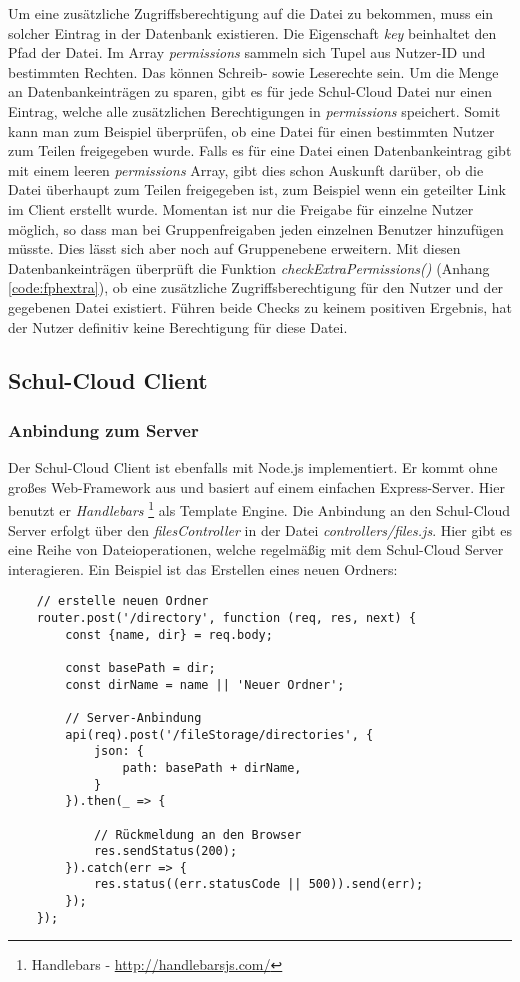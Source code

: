 Um eine zusätzliche Zugriffsberechtigung auf die Datei zu bekommen, muss ein solcher Eintrag in der Datenbank existieren. Die Eigenschaft \textit{key} beinhaltet den Pfad der Datei. Im Array \textit{permissions} sammeln sich Tupel aus Nutzer-ID und bestimmten Rechten. Das können Schreib- sowie Leserechte sein. Um die Menge an Datenbankeinträgen zu sparen, gibt es für jede Schul-Cloud Datei nur einen Eintrag, welche alle zusätzlichen Berechtigungen in \textit{permissions} speichert. Somit kann man zum Beispiel überprüfen, ob eine Datei für einen bestimmten Nutzer zum Teilen freigegeben wurde. Falls es für eine Datei einen Datenbankeintrag gibt mit einem leeren \textit{permissions} Array, gibt dies schon Auskunft darüber, ob die Datei überhaupt zum Teilen freigegeben ist, zum Beispiel wenn ein geteilter Link im Client erstellt wurde. Momentan ist nur die Freigabe für einzelne Nutzer möglich, so dass man bei Gruppenfreigaben jeden einzelnen Benutzer hinzufügen müsste. Dies lässt sich aber noch auf Gruppenebene erweitern. Mit diesen Datenbankeinträgen überprüft die Funktion \textit{checkExtraPermissions()} (Anhang \ref{code:fphextra}), ob eine zusätzliche Zugriffsberechtigung für den Nutzer und der gegebenen Datei existiert. Führen beide Checks zu keinem positiven Ergebnis, hat der Nutzer definitiv keine Berechtigung für diese Datei.

\subsection{Schul-Cloud Client}
\label{sec:client}

\subsubsection{Anbindung zum Server}
Der Schul-Cloud Client ist ebenfalls mit Node.js implementiert. Er kommt ohne großes Web-Framework aus und basiert auf einem einfachen Express-Server. Hier benutzt er \textit{Handlebars} \footnote{Handlebars - \url{http://handlebarsjs.com/}} als Template Engine. Die Anbindung an den Schul-Cloud Server erfolgt über den \textit{filesController} in der  Datei \textit{controllers/files.js}. Hier gibt es eine Reihe von Dateioperationen, welche regelmäßig mit dem Schul-Cloud Server interagieren. Ein Beispiel ist das Erstellen eines neuen Ordners:

\begin{lstlisting}
	// erstelle neuen Ordner
	router.post('/directory', function (req, res, next) {
		const {name, dir} = req.body;
	
		const basePath = dir;
		const dirName = name || 'Neuer Ordner';
		
		// Server-Anbindung
		api(req).post('/fileStorage/directories', {
			json: {
				path: basePath + dirName,
			}
		}).then(_ => {
			
			// Rückmeldung an den Browser
			res.sendStatus(200);
		}).catch(err => {
			res.status((err.statusCode || 500)).send(err);
		});
	});
\end{lstlisting} 


